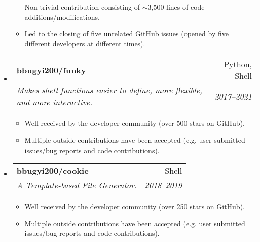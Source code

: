 \documentclass[letterpaper,11pt]{article}
\makeatletter
\newcommand{\ressubheading}[4]{
\begin{tabular*}{6.5in}{l@{\cftdotfill{\cftsecdotsep}\extracolsep{\fill}}r}
		\textbf{#1} & #2 \\
		\textit{#3} & \textit{#4} \\
\end{tabular*}\vspace{-6pt}}
\makeatother
\begin{document}
\begin{itemize}
\begin{itemize}
            Non-trivial contribution consisting of $\sim$3,500 lines of code additions/modifications.
        \item
            Led to the closing of five unrelated GitHub issues (opened by five different developers at different times).
    \end{itemize}
\item \ressubheading{bbugyi200/funky}{Python, Shell}{Makes shell functions easier to define, more flexible, and more interactive.}{2017--2021}
    \begin{itemize}
        \item
            Well received by the developer community (over 500 stars on GitHub).
        \item
            Multiple outside contributions have been accepted (e.g. user submitted issues/bug reports and code contributions).
    \end{itemize}
\item \ressubheading{bbugyi200/cookie}{Shell}{A Template-based File Generator.}{2018--2019}
    \begin{itemize}
        \item
            Well received by the developer community (over 250 stars on GitHub).
        \item
            Multiple outside contributions have been accepted (e.g. user submitted issues/bug reports and code contributions).
    \end{itemize}
\end{itemize}
\end{document}
